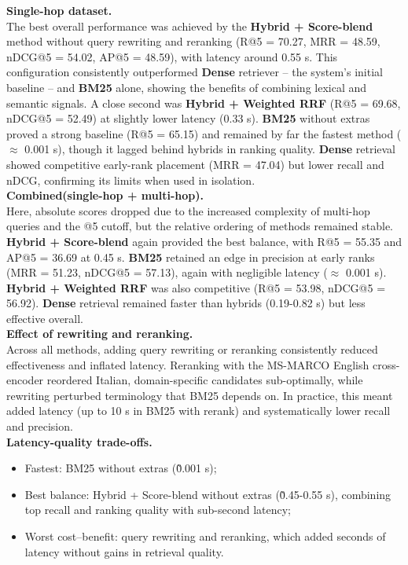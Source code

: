 \begin{spacing}{1.5}
\noindent \textbf{Single-hop dataset.}\\
The best overall performance was achieved by the \textbf{Hybrid + Score-blend} method without query rewriting and reranking (R@5 = 70.27, MRR = 48.59, nDCG@5 = 54.02, AP@5 = 48.59), with latency around 0.55 s. This configuration consistently outperformed \textbf{Dense} retriever -- the system’s initial baseline -- and \textbf{BM25} alone, showing the benefits of combining lexical and semantic signals. A close second was \textbf{Hybrid + Weighted RRF} (R@5 = 69.68, nDCG@5 = 52.49) at slightly lower latency (0.33 s).
\textbf{BM25} without extras proved a strong baseline (R@5 = 65.15) and remained by far the fastest method ($\approx$ 0.001 s), though it lagged behind hybrids in ranking quality. \textbf{Dense} retrieval showed competitive early-rank placement (MRR = 47.04) but lower recall and nDCG, confirming its limits when used in isolation.\\

\noindent \textbf{Combined(single-hop + multi-hop).}\\
Here, absolute scores dropped due to the increased complexity of multi-hop queries and the @5 cutoff, but the relative ordering of methods remained stable. \textbf{Hybrid + Score-blend} again provided the best balance, with R@5 = 55.35 and AP@5 = 36.69 at 0.45 s. \textbf{BM25} retained an edge in precision at early ranks (MRR = 51.23, nDCG@5 = 57.13), again with negligible latency ($\approx$ 0.001 s). \textbf{Hybrid + Weighted RRF} was also competitive (R@5 = 53.98, nDCG@5 = 56.92). \textbf{Dense} retrieval remained faster than hybrids (0.19-0.82 s) but less effective overall.\\

\noindent \textbf{Effect of rewriting and reranking.}\\
Across all methods, adding query rewriting or reranking consistently reduced effectiveness and inflated latency. Reranking with the MS-MARCO English cross-encoder reordered Italian, domain-specific candidates sub-optimally, while rewriting perturbed terminology that BM25 depends on. In practice, this meant added latency (up to 10 s in BM25 with rerank) and systematically lower recall and precision.\\

\noindent \textbf{Latency-quality trade-offs.}
\begin{itemize}
  \item Fastest: BM25 without extras (\~0.001 s);
  \item Best balance: Hybrid + Score-blend without extras (\~0.45-0.55 s), combining top recall and ranking quality with sub-second latency;
  \item Worst cost–benefit: query rewriting and reranking, which added seconds of latency without gains in retrieval quality.
\end{itemize}



\end{spacing}

